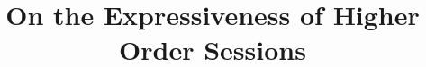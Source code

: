 \documentclass[envcountsect,orivec]{llncs}
\begin{document}
\pagestyle{plain}

\title {
	On the Expressiveness of Higher Order Sessions
}
\maketitle
%


%





%



%

%

%
%


%
%
%
\end{document}
